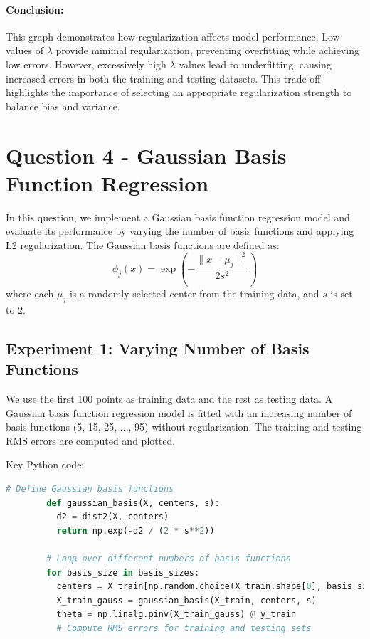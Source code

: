 \documentclass{article}
\begin{document}
	\paragraph{Conclusion:} This graph demonstrates how regularization affects model performance. Low values of $\lambda$ provide minimal regularization, preventing overfitting while achieving low errors. However, excessively high $\lambda$ values lead to underfitting, causing increased errors in both the training and testing datasets. This trade-off highlights the importance of selecting an appropriate regularization strength to balance bias and variance.
	
	
	\section*{Question 4 - Gaussian Basis Function Regression}
	
	In this question, we implement a Gaussian basis function regression model and evaluate its performance by varying the number of basis functions and applying L2 regularization. The Gaussian basis functions are defined as:
	\[
	\phi_j(x) = \exp\left(-\frac{\| x - \mu_j \|^2}{2s^2}\right)
	\]
	where each \(\mu_j\) is a randomly selected center from the training data, and \(s\) is set to 2.
	
	\subsection*{Experiment 1: Varying Number of Basis Functions}
	We use the first 100 points as training data and the rest as testing data. A Gaussian basis function regression model is fitted with an increasing number of basis functions (5, 15, 25, ..., 95) without regularization. The training and testing RMS errors are computed and plotted.
	
	Key Python code:
	\begin{lstlisting}[language=Python]
		# Define Gaussian basis functions
		def gaussian_basis(X, centers, s):
		  d2 = dist2(X, centers)
		  return np.exp(-d2 / (2 * s**2))
		
		# Loop over different numbers of basis functions
		for basis_size in basis_sizes:
		  centers = X_train[np.random.choice(X_train.shape[0], basis_size)]
		  X_train_gauss = gaussian_basis(X_train, centers, s)
		  theta = np.linalg.pinv(X_train_gauss) @ y_train
		  # Compute RMS errors for training and testing sets
	\end{lstlisting}
	
\end{document}
